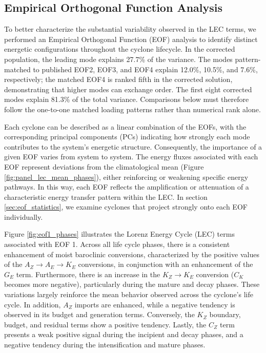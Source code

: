 \documentclass[pdflatex,sn-chicago]{sn-jnl}%
\theoremstyle{plain}
\theoremstyle{definition}
\theoremstyle{remark}
\theoremstyle{definition}
\begin{document}
\subsection{Empirical Orthogonal Function Analysis}\label{sec:eof}

To better characterize the substantial variability observed in the LEC terms, we performed an Empirical Orthogonal Function (EOF) analysis to identify distinct energetic configurations throughout the cyclone lifecycle. In the corrected population, the leading mode explains 27.7\% of the variance. The modes pattern-matched to published EOF2, EOF3, and EOF4 explain 12.0\%, 10.5\%, and 7.6\%, respectively; the matched EOF4 is ranked fifth in the corrected solution, demonstrating that higher modes can exchange order. The first eight corrected modes explain 81.3\% of the total variance. Comparisons below must therefore follow the one-to-one matched loading patterns rather than numerical rank alone.


Each cyclone can be described as a linear combination of the EOFs, with the corresponding principal components (PCs) indicating how strongly each mode contributes to the system’s energetic structure. Consequently, the importance of a given EOF varies from system to system. The energy fluxes associated with each EOF represent deviations from the climatological mean (Figure \ref{fig:panel_lec_mean_phases}), either reinforcing or weakening specific energy pathways. In this way, each EOF reflects the amplification or attenuation of a characteristic energy transfer pattern within the LEC. In section \ref{sec:eof_statistics}, we examine cyclones that project strongly onto each EOF individually.

Figure \ref{fig:eof1_phases} illustrates the Lorenz Energy Cycle (LEC) terms associated with EOF 1. Across all life cycle phases, there is a consistent enhancement of moist baroclinic conversions, characterized by the positive values of the $A_Z \rightarrow A_E \rightarrow K_E$ conversions, in conjunction with an enhancement of the $G_E$ term. Furthermore, there is an increase in the $K_Z \rightarrow K_E$ conversion ($C_K$ becomes more negative), particularly during the mature and decay phases. These variations largely reinforce the mean behavior observed across the cyclone's life cycle. In addition, $A_Z$ imports are enhanced, while a negative tendency is observed in its budget and generation terms. Conversely, the $K_Z$ boundary, budget, and residual terms show a positive tendency. Lastly, the $C_Z$ term presents a weak positive signal during the incipient and decay phases, and a negative tendency during the intensification and mature phases.
\end{document}
